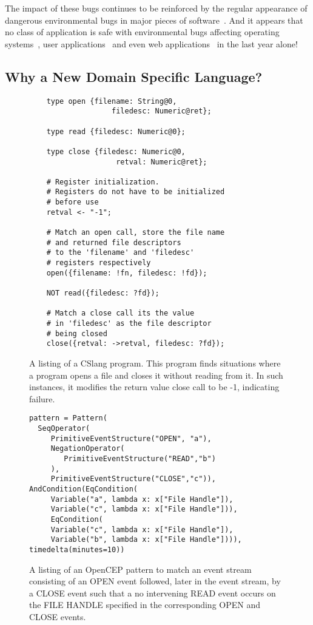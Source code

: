 The impact of these bugs continues to be reinforced by the regular
appearance of dangerous environmental bugs in major pieces of
software~\cite{devzeroroot}.  And it appears that no class of application
is safe with environmental bugs affecting operating systems~\cite{bad},
user applications~\cite{bad} and even web applications~\cite{bad} in the
last year alone!


\subsection{Why a New Domain Specific Language?}
\begin{figure}
  \begin{lstlisting}
    type open {filename: String@0,
                   filedesc: Numeric@ret};

    type read {filedesc: Numeric@0};

    type close {filedesc: Numeric@0,
                    retval: Numeric@ret};

    # Register initialization.
    # Registers do not have to be initialized
    # before use
    retval <- "-1";

    # Match an open call, store the file name
    # and returned file descriptors
    # to the 'filename' and 'filedesc'
    # registers respectively
    open({filename: !fn, filedesc: !fd});

    NOT read({filedesc: ?fd});

    # Match a close call its the value
    # in 'filedesc' as the file descriptor
    # being closed
    close({retval: ->retval, filedesc: ?fd});

  \end{lstlisting}
  \caption{A listing of a CSlang program.  This program finds situations
  where a program opens a file and closes it without reading from it.  In
  such instances, it modifies the return value close call to be -1,
  indicating failure.}
  \label{fig:CSlangListing}
\end{figure}

\begin{figure}
  \begin{lstlisting}
pattern = Pattern(
  SeqOperator(
     PrimitiveEventStructure("OPEN", "a"),
     NegationOperator(
        PrimitiveEventStructure("READ","b")
     ),
     PrimitiveEventStructure("CLOSE","c")),
AndCondition(EqCondition(
     Variable("a", lambda x: x["File Handle"]),
     Variable("c", lambda x: x["File Handle"])),
     EqCondition(
     Variable("c", lambda x: x["File Handle"]),
     Variable("b", lambda x: x["File Handle"]))),
timedelta(minutes=10))
  \end{lstlisting}
  \caption{
    A listing of an OpenCEP pattern to match an event stream consisting of an OPEN event followed, later in the event stream, by a CLOSE event such that a no intervening READ event occurs on the FILE HANDLE specified in the corresponding OPEN and CLOSE events.
}
  \label{fig:OpenCEPListing}
\end{figure}


